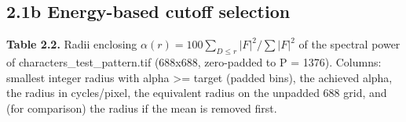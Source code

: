 \documentclass[10pt,a4paper]{article}
\begin{document}
\subsection{2.1b Energy-based cutoff selection}
\begin{table}[H]\centering\footnotesize{\small\textbf{Table 2.2.} Radii enclosing $\alpha(r)=100\sum_{D\le r}|F|^2/\sum|F|^2$ of the spectral power of characters\_test\_pattern.tif (688x688, zero-padded to P = 1376). Columns: smallest integer radius with alpha \textgreater{}= target (padded bins), the achieved alpha, the radius in cycles/pixel, the equivalent radius on the unpadded 688 grid, and (for comparison) the radius if the mean is removed first.\par}\vskip 3pt
\end{table}
\end{document}
